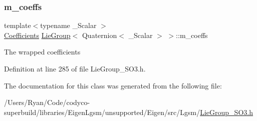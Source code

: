 \subsubsection{\texorpdfstring{m\+\_\+coeffs}{m\_coeffs}}
{\footnotesize\ttfamily template$<$typename \+\_\+\+Scalar $>$ \\
\hyperlink{class_lie_group_3_01_quaternion_3_01___scalar_01_4_01_4_a80504cfb3bcbf55c7d4c1e377ef9f782}{Coefficients} \hyperlink{class_lie_group}{Lie\+Group}$<$ Quaternion$<$ \+\_\+\+Scalar $>$ $>$\+::m\+\_\+coeffs\hspace{0.3cm}{\ttfamily [protected]}}

The wrapped coefficients 

Definition at line 285 of file Lie\+Group\+\_\+\+S\+O3.\+h.



The documentation for this class was generated from the following file\+:\begin{DoxyCompactItemize}
\item 
/\+Users/\+Ryan/\+Code/codyco-\/superbuild/libraries/\+Eigen\+Lgsm/unsupported/\+Eigen/src/\+Lgsm/\hyperlink{_lie_group___s_o3_8h}{Lie\+Group\+\_\+\+S\+O3.\+h}\end{DoxyCompactItemize}
